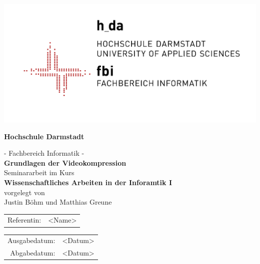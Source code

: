
\begin{titlepage}
\begin{center}
\includegraphics[scale=1.5]{gfx/LG0_fbi_r5005_lzw.png}

\vspace{0.8cm}
{\sf

{\LARGE\textbf{Hochschule Darmstadt}}\\ 

{\Large - Fachbereich Informatik - \\ 

\vspace{2.0cm} 
{\Huge\textbf{Grundlagen der Videokompression}}\\ 

\vspace{2.0cm}
Seminararbeit im Kurs\\
\textbf{Wissenschaftliches Arbeiten in der Inforamtik I}\\ 

\vspace{1.0cm}
vorgelegt von\\ 
Justin Böhm und Matthias Greune

\vspace{1.0cm} 
\begin{tabular}{rl} 
Referentin:& <Name>\\
\end{tabular}

\vspace{0.5cm}
\begin{tabular}{rl}
Ausgabedatum:& <Datum>\\
Abgabedatum:& <Datum>
\end{tabular}

} %

}

\end{center}
\end{titlepage}
